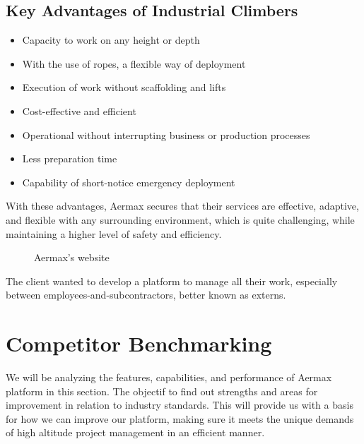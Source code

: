 \newpage


\subsection*{Key Advantages of Industrial Climbers}
\begin{itemize}
  \item Capacity to work on any height or depth
  \item With the use of ropes, a flexible way of deployment
  \item Execution of work without scaffolding and lifts
  \item Cost-effective and efficient
  \item Operational without interrupting business or production processes
  \item Less preparation time
  \item Capability of short-notice emergency deployment
\end{itemize}

With these advantages, Aermax secures that their services are effective, adaptive, and flexible with any surrounding environment, which is quite challenging, while maintaining a higher level of safety and efficiency.

\begin{figure}[H]
    \centering
    \caption{Aermax’s website}
    \label{fig:aermax-website}
\end{figure}

The client wanted to develop a platform to manage all their work, especially between employees-and-subcontractors, better known as externs.

\section{Competitor Benchmarking}
We will be analyzing the features, capabilities, and performance of Aermax platform in this section. The objectif to find out strengths and areas for improvement in relation to industry standards. This will provide us with a basis for how we can improve our platform, making sure it meets the unique demands of high altitude project management in an efficient manner.
